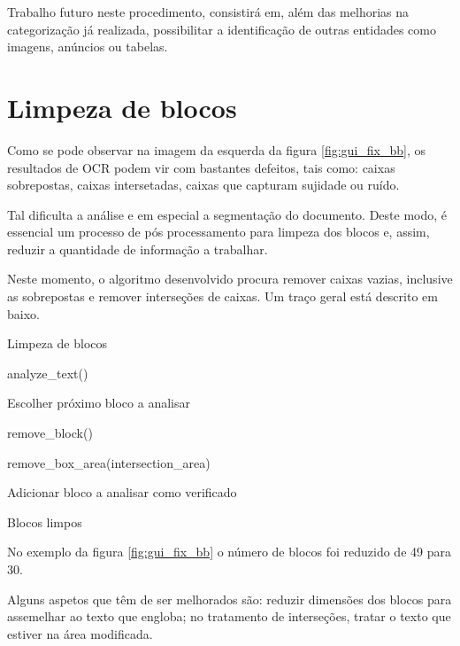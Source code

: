 Trabalho futuro neste procedimento, consistirá em, além das melhorias na categorização já realizada, possibilitar a identificação de outras entidades como imagens, anúncios ou tabelas.

\section{Limpeza de blocos}
\label{limpeza_blocos}

Como se pode observar na imagem da esquerda da figura \ref{fig:gui_fix_bb}, os resultados de OCR podem vir com bastantes defeitos, tais como: caixas sobrepostas, caixas intersetadas, caixas que capturam sujidade ou ruído.

Tal dificulta a análise e em especial a segmentação do documento. Deste modo, é essencial um processo de pós processamento para limpeza dos blocos e, assim, reduzir a quantidade de informação a trabalhar.

Neste momento, o algoritmo desenvolvido procura remover caixas vazias, inclusive as sobrepostas e remover interseções de caixas. Um traço geral está descrito em baixo.

\begin{algorithm}[H]
    \caption{Limpeza de blocos}
    \begin{algorithmic}[1]
    
    \STATE analyze\_text()

        \STATE Escolher próximo bloco a analisar 

                \STATE remove\_block()
            \ENDIF
        \ENDIF

            \STATE remove\_box\_area(intersection\_area)
        \ENDIF

        \STATE Adicionar bloco a analisar como verificado
    \ENDWHILE

    \RETURN Blocos limpos
    
\end{algorithmic}
\end{algorithm}

No exemplo da figura \ref{fig:gui_fix_bb} o número de blocos foi reduzido de 49 para 30.

Alguns aspetos que têm de ser melhorados são: reduzir dimensões dos blocos para assemelhar ao texto que engloba; no tratamento de interseções, tratar o texto que estiver na área modificada.


